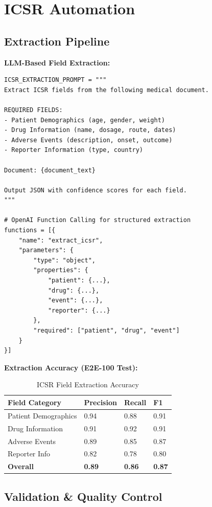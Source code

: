 \section{ICSR Automation}

\subsection{Extraction Pipeline}

\textbf{LLM-Based Field Extraction:}

\begin{lstlisting}[style=pythonstyle]
ICSR_EXTRACTION_PROMPT = """
Extract ICSR fields from the following medical document.

REQUIRED FIELDS:
- Patient Demographics (age, gender, weight)
- Drug Information (name, dosage, route, dates)
- Adverse Events (description, onset, outcome)
- Reporter Information (type, country)

Document: {document_text}

Output JSON with confidence scores for each field.
"""

# OpenAI Function Calling for structured extraction
functions = [{
    "name": "extract_icsr",
    "parameters": {
        "type": "object",
        "properties": {
            "patient": {...},
            "drug": {...},
            "event": {...},
            "reporter": {...}
        },
        "required": ["patient", "drug", "event"]
    }
}]
\end{lstlisting}

\textbf{Extraction Accuracy (E2E-100 Test):}
\begin{table}[h]
\centering
\caption{ICSR Field Extraction Accuracy}
\begin{tabularx}{\textwidth}{lXXX}
\toprule
\textbf{Field Category} & \textbf{Precision} & \textbf{Recall} & \textbf{F1} \\
\midrule
Patient Demographics & 0.94 & 0.88 & 0.91 \\
Drug Information & 0.91 & 0.92 & 0.91 \\
Adverse Events & 0.89 & 0.85 & 0.87 \\
Reporter Info & 0.82 & 0.78 & 0.80 \\
\textbf{Overall} & \textbf{0.89} & \textbf{0.86} & \textbf{0.87} \\
\bottomrule
\end{tabularx}
\end{table}

\subsection{Validation \& Quality Control}

